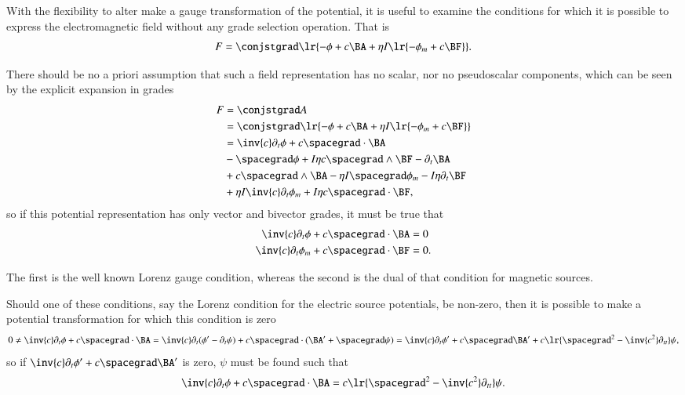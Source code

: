 %
%
With the flexibility to alter make a gauge transformation of the potential, it is useful to examine the conditions for which it is possible to express the electromagnetic field without any grade selection operation.
That is
\begin{dmath}\label{eqn:potentialSection_LorenzGauge:1720}
F
=
\conjstgrad
\lr{
      - \phi
      + c \BA
      + \eta I \lr{ -\phi_m + c \BF }
}.
\end{dmath}

There should be no a priori assumption that such a field representation has no scalar, nor no pseudoscalar components, which can be seen by the explicit expansion in grades
\begin{dmath}\label{eqn:potentialSection_LorenzGauge:1640}
\begin{aligned}
F
&=
\conjstgrad A \\
&=
\conjstgrad \lr{ -\phi + c \BA + \eta I \lr{ -\phi_m + c \BF } } \\
&=
\inv{c} \partial_t \phi
+ c \spacegrad \cdot \BA  \\
&-\spacegrad \phi
+ I \eta c \spacegrad \wedge \BF
- \partial_t \BA  \\
&+ c \spacegrad \wedge \BA
- \eta I \spacegrad \phi_m
- I \eta \partial_t \BF \\
&+ \eta I \inv{c} \partial_t \phi_m
+ I \eta c \spacegrad \cdot \BF,
\end{aligned}
\end{dmath}
so if this potential representation has only vector and bivector grades, it must be true that
\begin{dmath}\label{eqn:potentialSection_LorenzGauge:1660}
\begin{aligned}
\inv{c} \partial_t \phi + c \spacegrad \cdot \BA &= 0 \\
\inv{c} \partial_t \phi_m + c \spacegrad \cdot \BF &= 0.
\end{aligned}
\end{dmath}

The first is the well known Lorenz gauge condition, whereas the second is the dual of that condition for magnetic sources.

Should one of these conditions, say the Lorenz condition for the electric source potentials, be non-zero, then it is possible to make a potential transformation for which this condition is zero
\begin{dmath}\label{eqn:potentialSection_LorenzGauge:1680}
0 \ne
\inv{c} \partial_t \phi + c \spacegrad \cdot \BA
=
\inv{c} \partial_t (\phi' - \partial_t \psi) + c \spacegrad \cdot (\BA' + \spacegrad \psi)
=
\inv{c} \partial_t \phi' + c \spacegrad \BA'
+ c \lr{ \spacegrad^2 - \inv{c^2} \partial_{tt} } \psi,
\end{dmath}
so if \( \inv{c} \partial_t \phi' + c \spacegrad \BA' \) is zero, \( \psi \) must be found such that
\begin{dmath}\label{eqn:potentialSection_LorenzGauge:1700}
\inv{c} \partial_t \phi + c \spacegrad \cdot \BA
= c \lr{ \spacegrad^2 - \inv{c^2} \partial_{tt} } \psi.
\end{dmath}

